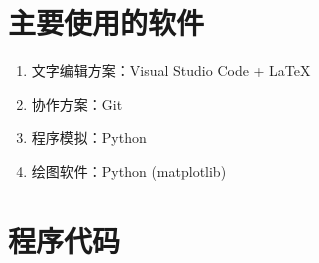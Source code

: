


\nocite{*}


\appendix
\section{主要使用的软件}

\begin{enumerate}
    \item 文字编辑方案：Visual Studio Code + \LaTeX
    \item 协作方案：Git
    \item 程序模拟：Python
    \item 绘图软件：Python (matplotlib)
\end{enumerate}

\section{程序代码}

